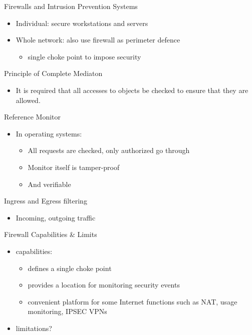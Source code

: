 \documentclass{beamer}
\begin{document}
\begin{frame}{Firewalls and Intrusion Prevention Systems}
  \begin{itemize}
  \item Individual: secure workstations and servers 
  \item Whole network: also use firewall as perimeter 
    defence 
    \begin{itemize}
    \item single choke point to impose security
    \end{itemize}
  \end{itemize}
\end{frame}

\begin{frame}{Principle of Complete Mediaton}
  \begin{itemize}
    \item It is required that all accesses to objects be checked 
to ensure that they are allowed.
  \end{itemize}
\end{frame}

\begin{frame}{Reference Monitor}
  \begin{itemize}
  \item In operating systems: 
    \begin{itemize}
    \item All requests are checked, only authorized go 
      through 
    \item Monitor itself is tamper-proof 
    \item And verifiable 
    \end{itemize}
  \end{itemize}
\end{frame}

\begin{frame}{Ingress and Egress filtering}
  \begin{itemize}
    \item Incoming, outgoing traffic
  \end{itemize}
\end{frame}

\begin{frame}{Firewall Capabilities \& Limits}
  \begin{itemize}
  \item capabilities: 
    \begin{itemize}
    \item defines a single choke point 
    \item provides a location for monitoring security events 
    \item convenient platform for some Internet functions such as 
      NAT, usage monitoring, IPSEC VPNs 
    \end{itemize}
  \item limitations?
  \end{itemize}
\end{frame}
\end{document}
